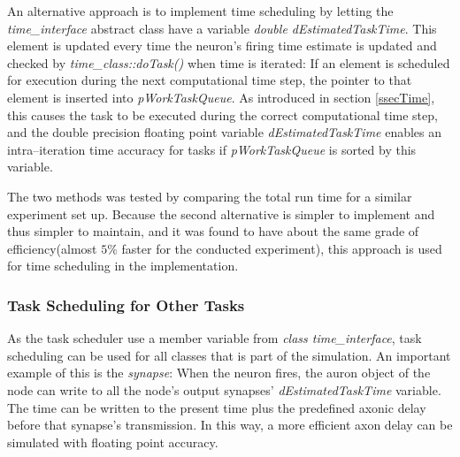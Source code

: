 			An alternative approach is to implement time scheduling by letting the \emph{time\_interface} abstract class have a variable \emph{double dEstimatedTaskTime}.
			This element is updated every time the neuron's firing time estimate is updated and checked by \emph{time\_class::doTask()} when time is iterated:
				If an element is scheduled for execution during the next computational time step, the pointer to that element is inserted into \emph{pWorkTaskQueue}.
			As introduced in section \ref{ssecTime}, this causes the task to be executed during the correct computational time step, 
				and the double precision floating point variable \emph{dEstimatedTaskTime} enables an intra--iteration time accuracy for tasks if \emph{pWorkTaskQueue} is
				 sorted by this variable.

			The two methods was tested by comparing the total run time for a similar experiment set up.
			Because the second alternative is simpler to implement and thus simpler to maintain,
				and it was found to have about the same grade of efficiency(almost $5\%$ faster for the conducted experiment),
				this approach is used for time scheduling in the implementation.
			
			\subsubsection{Task Scheduling for Other Tasks}
				As the task scheduler use a member variable from \emph{class time\_interface}, task scheduling can be used for all classes that is part of the simulation.
				An important example of this is the \emph{synapse}: %
					When the neuron fires, the auron object of the node can write to all the node's output synapses' \emph{dEstimatedTaskTime} variable.
				The time can be written to the present time plus the predefined axonic delay before that synapse's transmission.
				In this way, a more efficient axon delay can be simulated with floating point accuracy.



